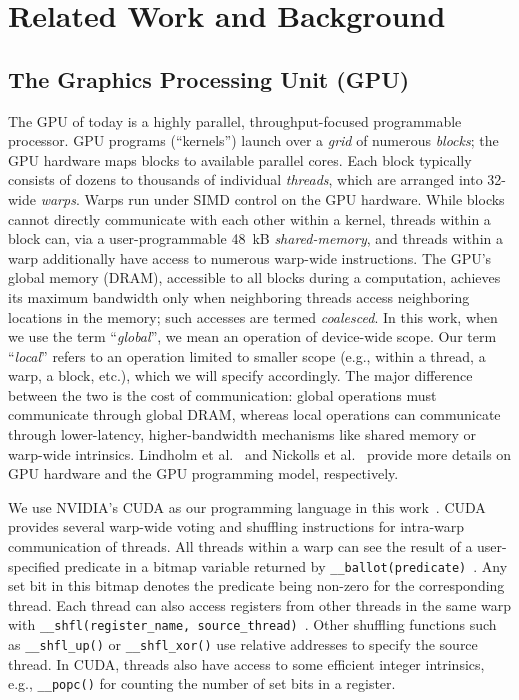 \section{Related Work and Background}\label{sec:related}
\subsection{The Graphics Processing Unit (GPU)}
The GPU of today is a highly parallel, throughput-focused programmable processor. GPU programs (``kernels'') launch over a \emph{grid} of numerous \emph{blocks}; the GPU hardware maps blocks to available parallel cores. Each block typically consists of dozens to thousands of individual \emph{threads}, which are arranged into 32-wide \emph{warps}. Warps run under SIMD control on the GPU hardware. While blocks cannot directly communicate with each other within a kernel, threads within a block can, via a user-programmable 48~kB \emph{shared-memory}, and threads within a warp additionally have access to numerous warp-wide instructions. The GPU's global memory (DRAM), accessible to all blocks during a computation, achieves its maximum bandwidth only when neighboring threads access neighboring locations in the memory; such accesses are termed \emph{coalesced}.
In this work, when we use the term ``\emph{global}'', we mean an operation of device-wide scope. Our term ``\emph{local}'' refers to an operation limited to smaller scope (e.g., within a thread, a warp, a block, etc.), which we will specify accordingly. The major difference between the two is the cost of communication: global operations must communicate through global DRAM, whereas local operations can communicate through lower-latency, higher-bandwidth mechanisms like shared memory or warp-wide intrinsics.
Lindholm et al.~ and Nickolls et al.~ provide more details on GPU hardware and the GPU programming model, respectively.

We use NVIDIA's CUDA as our programming language in this work~\cite{NVIDIA:2016:CUDA}. CUDA provides several warp-wide voting and shuffling instructions for intra-warp communication of threads. All threads within a warp can see the result of a user-specified predicate in a bitmap variable returned by \texttt{\_\_ballot(predicate)}~\cite[Ch.~B13]{NVIDIA:2016:CUDA}. Any set bit in this bitmap denotes the predicate  being non-zero for the corresponding thread. Each thread can also access registers from other threads in the same warp with \texttt{\_\_shfl(register\_name, source\_thread)}~\cite[Ch.~B14]{NVIDIA:2016:CUDA}. Other shuffling functions such as \texttt{\_\_shfl\_up()} or \texttt{\_\_shfl\_xor()} use relative addresses to specify the source thread.
In CUDA, threads also have access to some efficient integer intrinsics, e.g., \texttt{\texttt{\_\_popc()}} for counting the number of set bits in a register.

